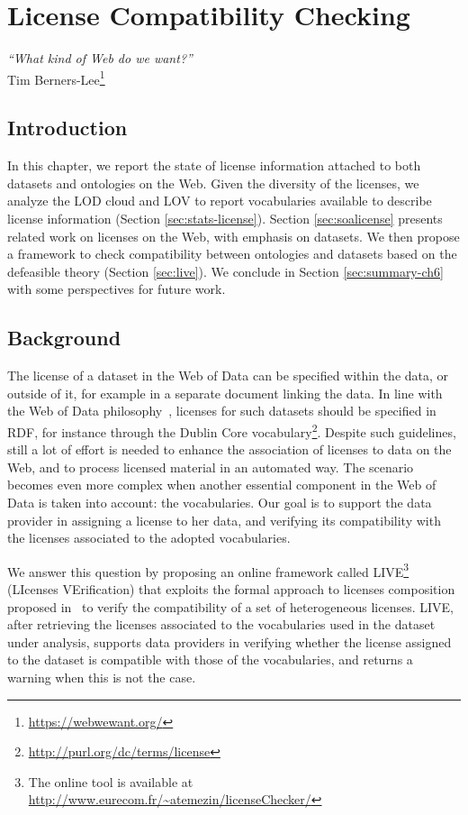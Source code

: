 
\chapter{License Compatibility Checking}
\label{ch:ch7}
\begin{flushright}
\textit{``What kind of Web do we want?''} \\
 Tim Berners-Lee\footnote{\url{https://webwewant.org/}}
 \end{flushright}


\section*{Introduction}

In this chapter, we report the state of license information attached to both datasets and ontologies on the Web. Given the diversity of the licenses, we analyze the LOD cloud and LOV to report vocabularies available to describe license information (Section \ref{sec:stats-license}). Section \ref{sec:soalicense} presents related work on licenses on the Web, with emphasis on datasets. We then propose a framework to check compatibility between ontologies and datasets based on the defeasible theory (Section \ref{sec:live}). We conclude in Section \ref{sec:summary-ch6} with some perspectives for future work.

\section{Background}
The license of a dataset in the Web of Data can be specified within the data, or outside of it, for example in a separate document linking the data. In line with the Web of Data philosophy~\cite{LinkedData2011}, licenses for such datasets should be specified in RDF, for instance through the Dublin Core vocabulary\footnote{\url{http://purl.org/dc/terms/license}}. Despite such guidelines, still a lot of effort is needed to enhance the association of licenses to data on the Web, and to process licensed material in an automated way. The scenario becomes even more complex when another essential component in the Web of Data is taken into account: the vocabularies. Our goal is to support the data provider in assigning a license to her data, and verifying its compatibility with the licenses associated to the adopted vocabularies.

We answer this question by proposing an online framework called LIVE\footnote{The online tool is available at \url{http://www.eurecom.fr/~atemezin/licenseChecker/}} (LIcenses VErification) that exploits the formal approach to licenses composition proposed in~\cite{DBLP:conf/semweb/GovernatoriRVG13} to verify the compatibility of a set of heterogeneous licenses. LIVE, after retrieving the licenses associated to the vocabularies used in the dataset under analysis, supports data providers in verifying whether the license assigned to the dataset is compatible with those of the vocabularies, and returns a warning when this is not the case.

